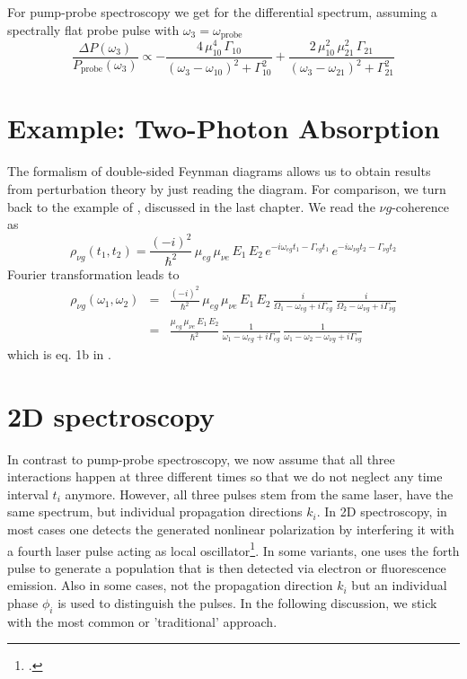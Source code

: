 For pump-probe spectroscopy we get for the differential spectrum, assuming a spectrally flat probe pulse with $\omega_3 = \omega_\text{probe}$
\begin{equation}
\frac{\Delta P (\omega_3)} {P_\text{probe}(\omega_3)} 
\propto
- \frac{4 \, \mu_{10}^4 \, \Gamma_{10} } { (\omega_3 - \omega_{10})^2 + \Gamma_{10}^2} 
+ \frac{2 \, \mu_{10}^2  \, \mu_{21}^2 \, \Gamma_{21} } { (\omega_3 - \omega_{21})^2 + \Gamma_{21}^2} 
\end{equation}


\section{Example: Two-Photon Absorption}

The formalism of double-sided Feynman diagrams allows us to obtain results from perturbation theory by just reading the diagram. For comparison, we turn back to the example of \cite{Winterhalder11}, discussed in the last chapter. We read the $\nu g $-coherence as
\begin{equation}
\rho_{\nu g}(t_1, t_2) = \frac{(-i)^2}{\hbar^2} \, \mu_{eg} \, \mu_{\nu e} \, E_1 \, E_2 \,
e^{-i \omega_{eg} t_1 - \Gamma_{eg} t_1} \, 
e^{-i \omega_{\nu g} t_2 - \Gamma_{\nu g} t_2} 
\end{equation}
Fourier transformation leads to
\begin{eqnarray}
\rho_{\nu g}(\omega_1, \omega_2) &=& \frac{(-i)^2}{\hbar^2} \, \mu_{eg} \, \mu_{\nu e} \, E_1 \, E_2 \,
    \frac{i }{\Omega_1 - \omega_{eg}  + i \Gamma_{eg} } 
  \, \frac{i }{\Omega_2  -\omega_{\nu g}  + i \Gamma_{\nu g} } \\
  &=& \frac{\mu_{eg} \, \mu_{\nu e} \, E_1 \, E_2 }{\hbar^2} \,
  \frac{1 }{\omega_1 - \omega_{eg}  + i \Gamma_{eg} } 
  \, \frac{1}{\omega_1 - \omega_2  -\omega_{\nu g}  + i \Gamma_{\nu g} } 
\end{eqnarray}
which is eq. 1b in \cite{Winterhalder11}.
 

\section{2D spectroscopy}


In contrast to pump-probe spectroscopy, we now assume that all three interactions happen at three different times so that we do not neglect any time interval $t_i$ anymore. However, all three pulses stem from the same laser, have the same spectrum, but individual propagation directions $k_i$. In 2D spectroscopy, in most cases one detects the generated nonlinear polarization by  interfering it with a fourth laser pulse acting as local oscillator\footcite{Ogilvie15,Scholes13}. In some variants, one uses the forth pulse to generate a population that is then detected via electron or fluorescence emission. Also in some cases, not the propagation direction $k_i$ but an individual phase $\phi_i$ is used to distinguish the pulses. In the following discussion, we stick with the most common or 'traditional' approach.

